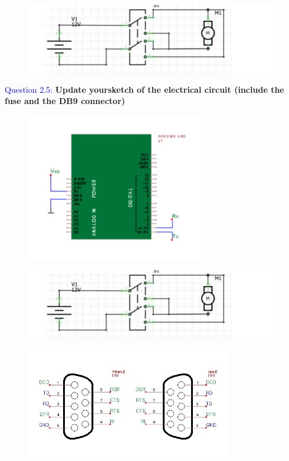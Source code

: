 \documentclass[12pt, a4papre]{article}
\begin{document}
	\begin{figure}[H]
		\begin{center}
		\includegraphics[width=140mm]{pregunta2_4.jpeg}
		\end{center}
	\end{figure}
	
	\textcolor{blue}{Question 2.5:} \textbf{Update yoursketch of the electrical circuit (include the fuse and the DB9 connector)}
	
	\begin{figure}[H]
		\begin{center}
		\includegraphics[width=80mm]{pregunta2_5.png}
		\end{center}
	\end{figure}
	
	\begin{figure}[H]
		\begin{center}
		\includegraphics[width=130mm]{pregunta2_4.jpeg}
		\end{center}
	\end{figure}
	
	\begin{figure}[H]
		\begin{center}
		\includegraphics[width=90mm]{DB9Subs.jpeg}
		\end{center}
	\end{figure}
	
\end{document}
